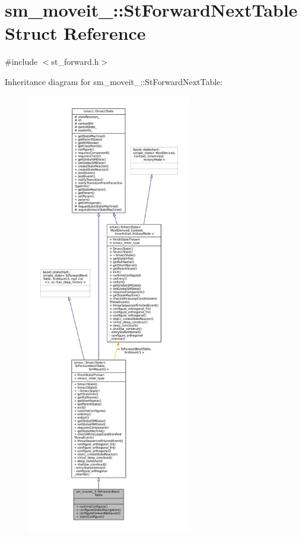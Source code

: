 \hypertarget{structsm__moveit__3_1_1StForwardNextTable}{}\section{sm\+\_\+moveit\+\_\+:\+:St\+Forward\+Next\+Table Struct Reference}
\label{structsm__moveit__3_1_1StForwardNextTable}


{\ttfamily \#include $<$st\+\_\+forward.\+h$>$}



Inheritance diagram for sm\+\_\+moveit\+\_\+:\+:St\+Forward\+Next\+Table\+:
\nopagebreak
\begin{figure}[H]
\begin{center}
\leavevmode
\includegraphics[height=550pt]{structsm__moveit__3_1_1StForwardNextTable__inherit__graph}
\end{center}
\end{figure}


